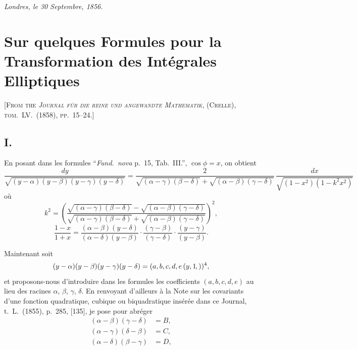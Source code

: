 \documentclass[11pt,a4paper]{article}
\newcommand{\fcn}[2]{(#1\kern-1pt, #2)}
\begin{document}
\medskip
\noindent\textit{Londres, le 30 Septembre, 1856.}

\newpage


\setcounter{page}{60}

\section*{Sur quelques Formules pour la Transformation des Int\'egrales Elliptiques}
\label{paper:235}

\textsc{[From the \textit{Journal f\"ur die reine und angewandte Mathematik}, (Crelle), tom.~LV.\ (1858), pp.~15--24.]}

\subsection*{I.}

En posant dans les formules ``\textit{Fund.\ nova} p.~15, Tab.~III.'', $\cos\phi=x$,
on obtient
\[
\frac{dy}{\sqrt{(y-\alpha)(y-\beta)(y-\gamma)(y-\delta)}} = \frac{2}{\sqrt{(\alpha-\gamma)(\beta-\delta)} + \sqrt{(\alpha-\beta)(\gamma-\delta)}}\,\frac{dx}{\sqrt{(1-x^2)(1-k^2x^2)}}
\]
o\`u
\[
k^2 = \left(\frac{\sqrt{(\alpha-\gamma)(\beta-\delta)} - \sqrt{(\alpha-\beta)(\gamma-\delta)}}{\sqrt{(\alpha-\gamma)(\beta-\delta)} + \sqrt{(\alpha-\beta)(\gamma-\delta)}}\right)^{\!2},
\]
\[
\frac{1-x}{1+x} = \frac{(\alpha-\beta)(y-\delta)}{(\alpha-\delta)(y-\beta)}\cdot\frac{(\gamma-\beta)}{(\gamma-\delta)} \cdot \frac{(y-\gamma)}{(y-\beta)}.
\]

Maintenant soit
\[
(y-\alpha)(y-\beta)(y-\gamma)(y-\delta) = (a,b,c,d,e\,\fcn{y,1})^4,
\]
et proposons-nous d'introduire dans les formules les coefficients $(a,b,c,d,e)$ au
lieu des racines $\alpha$, $\beta$, $\gamma$, $\delta$. En renvoyant d'ailleurs \`a
la Note sur les covariants d'une fonction quadratique, cubique ou biquadratique
ins\'er\'ee dans ce Journal, t.~L.\ (1855), p.~285, [135], je pose pour abr\'eger
\begin{align*}
(\alpha-\beta)(\gamma-\delta) &= B,\\
(\alpha-\gamma)(\delta-\beta) &= C,\\
(\alpha-\delta)(\beta-\gamma) &= D,
\end{align*}
\end{document}
